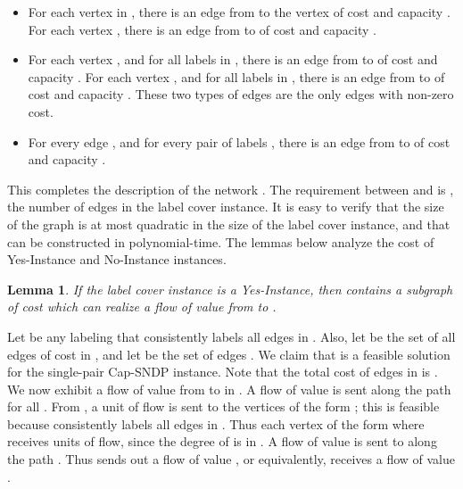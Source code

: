 \documentclass[11pt]{article}
\newtheorem{lemma}{Lemma}[section]
\newcommand{\yes}{{\sc Yes-Instance}\xspace}
\newcommand{\no}{{\sc No-Instance}\xspace}
\renewenvironment{proof}{\vspace{-0.1in}\noindent{\bf Proof:}}{\hspace*{\fill}\par}
\begin{document}
 \vspace{-3mm}
\begin{itemize}
\item For each vertex  in , there is an edge from  to the
  vertex  of cost  and capacity . For each vertex
  , there is an edge from  to  of
  cost  and capacity .

\item For each vertex , and for all labels  in , there is
  an edge from  to  of cost  and
  capacity . For each vertex , and for all labels  in ,
  there is an edge from  to  of cost 
  and capacity . These two types of edges are the only edges
  with non-zero cost.

\item For every edge , and for every pair of labels
  , there is an edge from 
  to  of cost  and capacity .
\end{itemize}
\vspace{-2mm}
\noindent
This completes the description of the network . The requirement
 between  and  is , the number of edges in the label cover instance.
It is easy to verify that the size of the graph  is at most quadratic
in the size of the label cover
instance, and that  can be constructed in polynomial-time.
The lemmas below analyze the cost of \yes and \no instances.

\begin{lemma}\label{lemm:yes}
If the label cover instance is a \yes, then  contains a subgraph
of cost  which can realize a flow of value  from  to .
\end{lemma}
\begin{proof}Let  be any labeling that consistently labels all edges in .
Also, let  be the set of all edges of cost  in , and
let  be  the set of edges . We claim that  is a feasible
  solution for the single-pair Cap-SNDP instance.
  Note that the total cost of edges in  is .
  We now exhibit a flow of value  from  to  in .
   A flow of value  is sent along the path  for all .  From , a unit of flow is sent
  to the  vertices of the form ; this is feasible because   consistently
    labels all edges in .  Thus each vertex of the form 
    where  receives 
  units of flow, since the degree of  is  in .  A flow of
  value  is sent to  along the path . Thus 
  sends out a flow of value , or equivalently,  receives a flow of value
  .
\end{proof}
\end{document}
